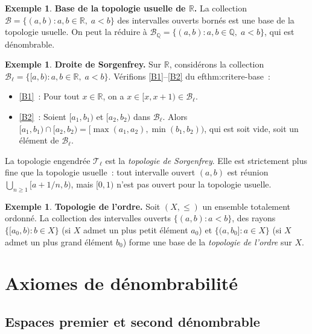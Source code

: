 \documentclass[12pt,a4paper,openany]{book}
\theoremstyle{definition}
\theoremstyle{cours}
\theoremstyle{coursnormal}
\newtheorem{exemple}[theoreme]{Exemple}
\newcommand{\Q}{\mathbb{Q}}
\newcommand{\R}{\mathbb{R}}
\newcommand{\T}{\mathcal{T}}
\newcommand{\B}{\mathcal{B}}
\begin{document}
\begin{exemple}\label{ex:base-R-usuelle}
  \textbf{Base de la topologie usuelle de $\R$.}
  La collection $\B=\{(a,b) : a,b\in\R,\; a<b\}$ des intervalles ouverts
  bornés est une base de la topologie usuelle. On peut la réduire à
  $\B_{\Q}=\{(a,b) : a,b\in\Q,\; a<b\}$, qui est dénombrable.
\end{exemple}

\begin{exemple}\label{ex:base-sorgenfrey}
  \textbf{Droite de Sorgenfrey.}
  Sur $\R$, considérons la collection
  $\B_\ell = \{[a,b) : a,b\in\R,\; a<b\}$.
  Vérifions \ref{B1}--\ref{B2} du 
ef{thm:critere-base}~:
  \begin{itemize}
    \item \ref{B1}~: Pour tout $x\in\R$, on a $x\in[x,x+1)\in\B_\ell$.
    \item \ref{B2}~: Soient $[a_1,b_1)$ et $[a_2,b_2)$ dans $\B_\ell$.
      Alors $[a_1,b_1)\cap[a_2,b_2) = [\max(a_1,a_2),\min(b_1,b_2))$, qui est
      soit vide, soit un élément de $\B_\ell$.
  \end{itemize}
  La topologie engendrée $\T_\ell$ est la \emph{topologie de Sorgenfrey}. Elle
  est strictement plus fine que la topologie usuelle~: tout intervalle ouvert
  $(a,b)$ est réunion $\bigcup_{n\geq 1}[a+1/n,b)$, mais $[0,1)$ n'est pas
  ouvert pour la topologie usuelle.
\end{exemple}

\begin{exemple}\label{ex:base-ordre}
  \textbf{Topologie de l'ordre.}
  Soit $(X,\leq)$ un ensemble totalement ordonné. La collection des
  intervalles ouverts $\{(a,b) : a<b\}$, des rayons $\{[a_0,b) : b\in X\}$
  (si $X$ admet un plus petit élément $a_0$) et $\{(a,b_0] : a\in X\}$ (si
  $X$ admet un plus grand élément $b_0$) forme une base de la
  \emph{topologie de l'ordre} sur $X$.
\end{exemple}

\section{Axiomes de dénombrabilité}\label{sec:axiomes-denombrabilite}

\subsection{Espaces premier et second dénombrable}\label{subsec:premier-second}
\end{document}
